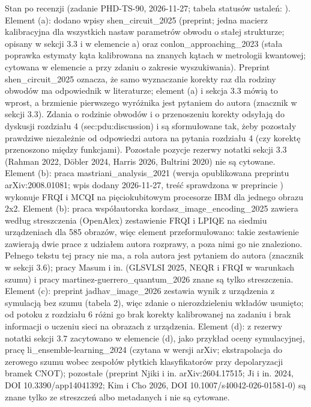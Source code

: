 {Stan po recenzji (zadanie PHD-TS-90, 2026-11-27; tabela statusów ustaleń: ).
Element (a): dodano wpisy shen_circuit_2025 (preprint; jedna macierz kalibracyjna dla wszystkich nastaw parametrów obwodu o stałej strukturze; opisany w sekcji 3.3 i w elemencie a) oraz conlon_approaching_2023 (stała poprawka estymaty kąta kalibrowana na znanych kątach w metrologii kwantowej; cytowana w elemencie a przy zdaniu o zakresie wyszukiwania).
Preprint shen_circuit_2025 oznacza, że samo wyznaczanie korekty raz dla rodziny obwodów ma odpowiednik w literaturze; element (a) i sekcja 3.3 mówią to wprost, a brzmienie pierwszego wyróżnika jest pytaniem do autora (znacznik w sekcji 3.3).
Zdania o rodzinie obwodów i o przenoszeniu korekty odsyłają do dyskusji rozdziału 4 (sec:pdu:discussion) i są sformułowane tak, żeby pozostały prawdziwe niezależnie od odpowiedzi autora na pytania rozdziału 4 (czy korektę przenoszono między funkcjami).
Pozostałe pozycje rezerwy notatki sekcji 3.3 (Rahman 2022, Döbler 2024, Harris 2026, Bultrini 2020) nie są cytowane.
Element (b): praca mastriani_analysis_2021 (wersja opublikowana preprintu arXiv:2008.01081; wpis dodany 2026-11-27, treść sprawdzona w preprincie ) wykonuje FRQI i MCQI na pięciokubitowym procesorze IBM dla jednego obrazu 2x2.
Element (b): praca współautorska kordasz_image_encoding_2025 zawiera według streszczenia (OpenAlex) zestawienie FRQI i LPIQE na siedmiu urządzeniach dla 585 obrazów, więc element przeformułowano: takie zestawienie zawierają dwie prace z udziałem autora rozprawy, a poza nimi go nie znaleziono.
Pełnego tekstu tej pracy nie ma, a rola autora jest pytaniem do autora (znacznik w sekcji 3.6); pracy Masum i in. (GLSVLSI 2025, NEQR i FRQI w warunkach szumu) i pracy martinez-guerrero_quantum_2026 znane są tylko streszczenia.
Element (c): preprint jadhav_image_2026 zestawia wynik z urządzenia z symulacją bez szumu (tabela 2), więc zdanie o nierozdzieleniu wkładów usunięto; od potoku z rozdziału 6 różni go brak korekty kalibrowanej na zadaniu i brak informacji o uczeniu sieci na obrazach z urządzenia.
Element (d): z rezerwy notatki sekcji 3.7 zacytowano w elemencie (d), jako przykład oceny symulacyjnej, pracę li_ensemble-learning_2024 (czytana w wersji arXiv; ekstrapolacja do zerowego szumu wobec zespołów płytkich klasyfikatorów przy depolaryzacji bramek CNOT); pozostałe (preprint Njiki i in. arXiv:2604.17515; Ji i in. 2024, DOI 10.3390/app14041392; Kim i Cho 2026, DOI 10.1007/s40042-026-01581-0) są znane tylko ze streszczeń albo metadanych i nie są cytowane.
}
